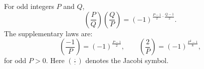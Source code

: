 For odd integers $P$ and $Q$,
$$\left(\frac{P}{Q}\right) \left(\frac{Q}{P}\right) = (-1)^{\frac{P-1}{2} \cdot \frac{Q-1}{2}}.$$
The supplementary laws are:
$$\left(\frac{-1}{P}\right) = (-1)^{\frac{P-1}{2}}, \qquad \left(\frac{2}{P}\right) = (-1)^{\frac{P^2-1}{8}},$$
for odd $P > 0$. Here $\left(\frac{\cdot}{\cdot}\right)$ denotes the Jacobi symbol.
